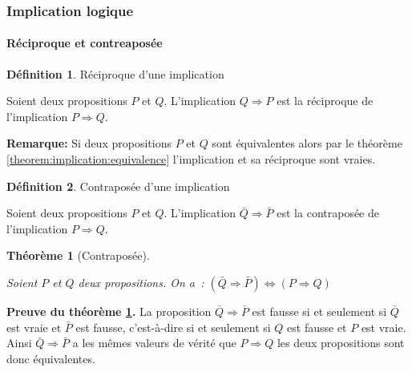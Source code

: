 \documentclass[10pt,notheorems]{beamer}
\theoremstyle{plain}
\newtheorem{theorem}{Théorème}
\theoremstyle{definition} %
\newtheorem{definition}{Définition}
\begin{document}
\begin{frame}
  \frametitle{Implication logique}
  \framesubtitle{Réciproque et contreaposée}
  \hypertarget{slide_reciproque_et_contraposee}{}

  \begin{definition}{Réciproque d'une implication}\label{def:implication:equivalence}

    Soient deux propositions $P$ et $Q$. L'implication $Q\Rightarrow P$ est la réciproque de l'implication $P\Rightarrow Q$.
  \end{definition}

  \bigskip

  \textbf{Remarque:} Si deux propositions $P$ et $Q$ sont équivalentes alors par le théorème \hyperlink{slide_implication_et_equivalence_1}{\ref{theorem:implication:equivalence}} l'implication et sa réciproque sont vraies.

  \bigskip

  \begin{definition}{Contraposée d'une implication}\label{def:implication:contraposee}

    Soient deux propositions $P$ et $Q$. L'implication $\bar Q\Rightarrow \bar P$ est la contraposée de l'implication $P\Rightarrow Q$.
  \end{definition}

  \bigskip

  \begin{theorem}[Contraposée]\label{theorem:implication:contraposee}

    Soient $P$ et $Q$ deux propositions. On a~: $(\bar Q \Rightarrow \bar P) \Leftrightarrow (P\Rightarrow Q)$
  \end{theorem}
\end{frame}

\begin{notes}

  \textbf{Preuve du théorème \hyperlink{slide_reciproque_et_contraposee}{\ref{theorem:implication:contraposee}}.} La proposition
  $\bar Q \Rightarrow \bar P$ est fausse si et seulement si $\bar Q$
  est vraie et $\bar P$ est fausse, c'est-à-dire si et seulement si $Q$
  est fausse et $P$ est vraie. Ainsi $\bar Q \Rightarrow \bar P$ a les
  mêmes valeurs de vérité que $P\Rightarrow Q$ les deux propositions
  sont donc équivalentes.

\end{notes}
\end{document}
